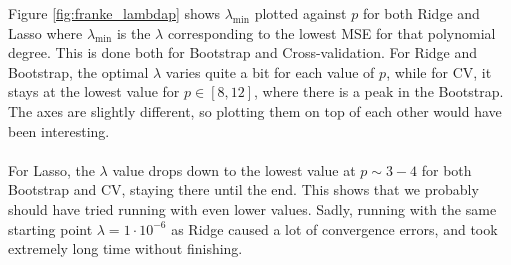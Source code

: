 \documentclass[a4paper]{article}
\begin{document}
Figure \ref{fig:franke_lambdap} shows $\lambda_{\text{min}}$ plotted against $p$ for both Ridge and Lasso where $\lambda_{\text{min}}$ is the $\lambda$ corresponding to the lowest MSE for that polynomial degree. This is done both for Bootstrap and Cross-validation. For Ridge and Bootstrap, the optimal $\lambda$ varies quite a bit for each value of $p$, while for CV, it stays at the lowest value for $p \in [8, 12]$, where there is a peak in the Bootstrap. The axes are slightly different, so plotting them on top of each other would have been interesting.\\\\
For Lasso, the $\lambda$ value drops down to the lowest value at $p\sim3-4$ for both Bootstrap and CV, staying there until the end. This shows that we probably should have tried running with even lower values. Sadly, running with the same starting point $\lambda = 1\cdot10^{-6}$ as Ridge caused a lot of convergence errors, and took extremely long time without finishing.
\end{document}
